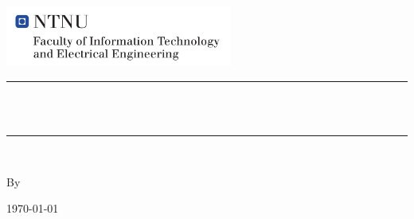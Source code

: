 \begin{titlepage}
\begin{center}

 
~\\[0.5cm]
\includegraphics[height=2.0cm]{Images/NTNU_logo.pdf}\\[1cm]  

\hrule ~\\[0.2cm]
{\huge \bfseries \mytitle}\\[0.4cm]		%
\hrule ~\\[1.5cm]

\begin{minipage}{1\textwidth}
    \centering
	\large
	By
		\myauthor
\end{minipage}

\vfill
{\large \today}
~\\[0.5cm]


\end{center}
\end{titlepage}